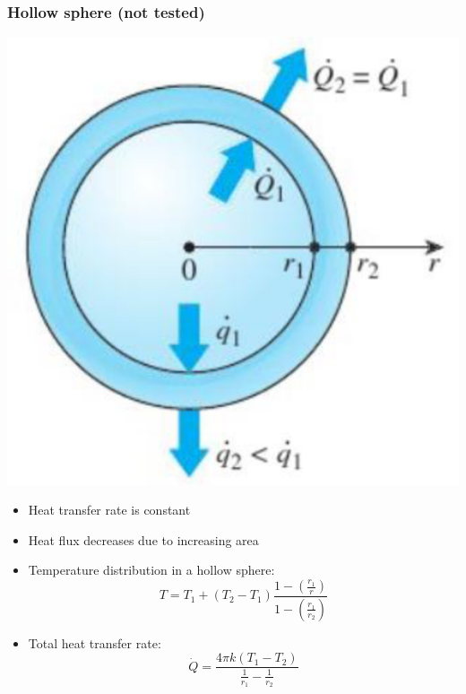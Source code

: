 \documentclass[11pt]{article}
\begin{document}
\subsubsection{Hollow sphere (not tested)}
\label{sec:org5da86ca}
\begin{center}
\includegraphics[width=.9\linewidth]{./images/steady-state-heat-conduction-hollow-sphere.png}
\end{center}
\begin{itemize}
\item Heat transfer rate is constant
\item Heat flux decreases due to increasing area
\item Temperature distribution in a hollow sphere:
\[T = T_1 + (T_2 - T_1) \frac{1 - \left(\frac{r_1}{r} \right)}{1 - \left(\frac{r_1}{r_2} \right)}\]
\item Total heat transfer rate:
\[\dot{Q} = \frac{4 \pi k (T_1 - T_2)}{\frac{1}{r_1} - \frac{1}{r_2}}\]
\end{itemize}
\end{document}
